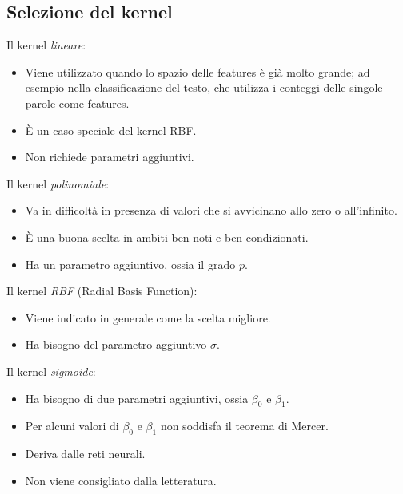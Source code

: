 \documentclass[a4paper,oneside,titlepage]{book}
\begin{document}
\subsection{Selezione del kernel}
Il kernel \textit{lineare}:
\begin{itemize}
    \item Viene utilizzato quando lo spazio delle features è già molto grande; ad esempio nella classificazione del testo, che utilizza i conteggi delle singole parole come features.
    \item \`{E} un caso speciale del kernel RBF.
    \item Non richiede parametri aggiuntivi. 
\end{itemize}
Il kernel \textit{polinomiale}:
\begin{itemize}
    \item Va in difficoltà in presenza di valori che si avvicinano allo zero o all'infinito.
    \item \`{E} una buona scelta in ambiti ben noti e ben condizionati.
    \item Ha un parametro aggiuntivo, ossia il grado $p$.
\end{itemize}
Il kernel \textit{RBF} (Radial Basis Function):
\begin{itemize}
    \item Viene indicato in generale come la scelta migliore.
    \item Ha bisogno del parametro aggiuntivo $\sigma$.
\end{itemize}
Il kernel \textit{sigmoide}:
\begin{itemize}
    \item Ha bisogno di due parametri aggiuntivi, ossia $\beta_0$ e $\beta_1$.
    \item Per alcuni valori di $\beta_0$ e $\beta_1$ non soddisfa il teorema di Mercer.
    \item Deriva dalle reti neurali.
    \item Non viene consigliato dalla letteratura.
\end{itemize}
\end{document}
